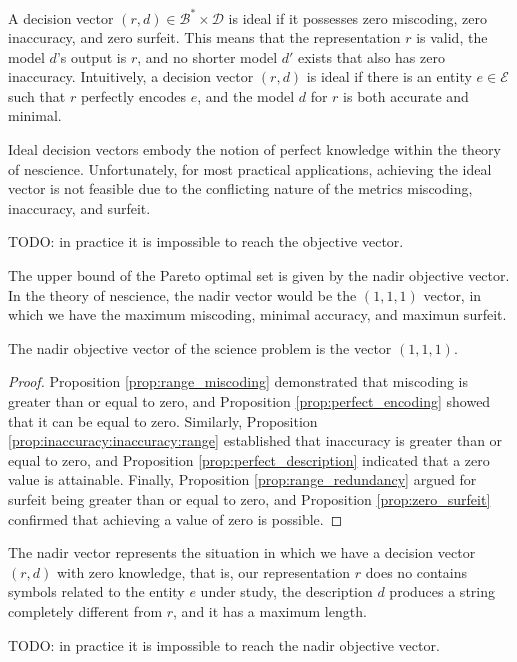 A decision vector $(r, d) \in \mathcal{B}^\ast \times \mathcal{D}$ is ideal if it possesses zero miscoding, zero inaccuracy, and zero surfeit. This means that the representation $r$ is valid, the model $d$'s output is $r$, and no shorter model $d'$ exists that also has zero inaccuracy. Intuitively, a decision vector $(r, d)$ is ideal if there is an entity $e \in \mathcal{E}$ such that $r$ perfectly encodes $e$, and the model $d$ for $r$ is both accurate and minimal.

Ideal decision vectors embody the notion of perfect knowledge within the theory of nescience. Unfortunately, for most practical applications, achieving the ideal vector is not feasible due to the conflicting nature of the metrics miscoding, inaccuracy, and surfeit.

\begin{example}
{\color{red} TODO: in practice it is impossible to reach the objective vector.}
\end{example}

{\color{red}

The upper bound of the Pareto optimal set is given by the nadir objective vector. In the theory of nescience, the nadir vector would be the $(1, 1, 1)$ vector, in which we have the maximum miscoding, minimal accuracy, and maximun surfeit.

\begin{proposition}
The nadir objective vector of the science problem is the vector $(1, 1, 1)$.
\end{proposition}
\begin{proof}
Proposition \ref{prop:range_miscoding} demonstrated that miscoding is greater than or equal to zero, and Proposition \ref{prop:perfect_encoding} showed that it can be equal to zero. Similarly, Proposition \ref{prop:inaccuracy:inaccuracy:range} established that inaccuracy is greater than or equal to zero, and Proposition \ref{prop:perfect_description} indicated that a zero value is attainable. Finally, Proposition \ref{prop:range_redundancy} argued for surfeit being greater than or equal to zero, and Proposition \ref{prop:zero_surfeit} confirmed that achieving a value of zero is possible.
\end{proof}

The nadir vector represents the situation in which we have a decision vector $(r, d)$ with zero knowledge, that is, our representation $r$ does no contains symbols related to the entity $e$ under study, the description $d$ produces a string completely different from $r$, and it has a maximum length.

\begin{example}
{\color{red} TODO: in practice it is impossible to reach the nadir objective vector.}
\end{example}

}

